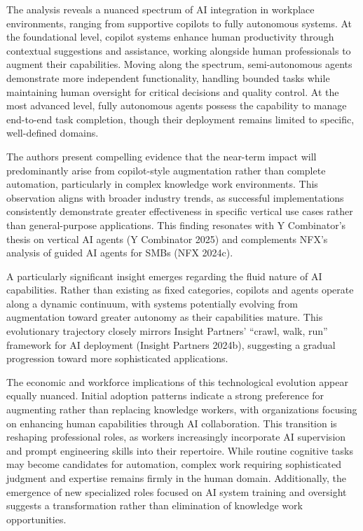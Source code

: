 \documentclass[
]{article}
\begin{document}
The analysis reveals a nuanced spectrum of AI integration in workplace
environments, ranging from supportive copilots to fully autonomous
systems. At the foundational level, copilot systems enhance human
productivity through contextual suggestions and assistance, working
alongside human professionals to augment their capabilities. Moving
along the spectrum, semi-autonomous agents demonstrate more independent
functionality, handling bounded tasks while maintaining human oversight
for critical decisions and quality control. At the most advanced level,
fully autonomous agents possess the capability to manage end-to-end task
completion, though their deployment remains limited to specific,
well-defined domains.

The authors present compelling evidence that the near-term impact will
predominantly arise from copilot-style augmentation rather than complete
automation, particularly in complex knowledge work environments. This
observation aligns with broader industry trends, as successful
implementations consistently demonstrate greater effectiveness in
specific vertical use cases rather than general-purpose applications.
This finding resonates with Y Combinator's thesis on vertical AI agents
(Y Combinator 2025) and complements NFX's analysis of guided AI agents
for SMBs (NFX 2024c).

A particularly significant insight emerges regarding the fluid nature of
AI capabilities. Rather than existing as fixed categories, copilots and
agents operate along a dynamic continuum, with systems potentially
evolving from augmentation toward greater autonomy as their capabilities
mature. This evolutionary trajectory closely mirrors Insight Partners'
``crawl, walk, run'' framework for AI deployment (Insight Partners
2024b), suggesting a gradual progression toward more sophisticated
applications.

The economic and workforce implications of this technological evolution
appear equally nuanced. Initial adoption patterns indicate a strong
preference for augmenting rather than replacing knowledge workers, with
organizations focusing on enhancing human capabilities through AI
collaboration. This transition is reshaping professional roles, as
workers increasingly incorporate AI supervision and prompt engineering
skills into their repertoire. While routine cognitive tasks may become
candidates for automation, complex work requiring sophisticated judgment
and expertise remains firmly in the human domain. Additionally, the
emergence of new specialized roles focused on AI system training and
oversight suggests a transformation rather than elimination of knowledge
work opportunities.
\end{document}

